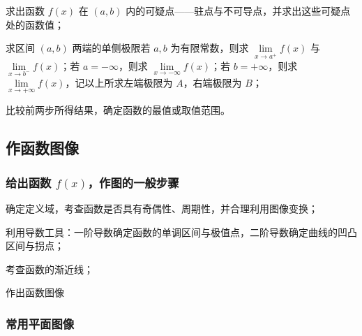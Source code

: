 \documentclass[a4paper,12pt]{article}
\begin{document}
    \begin{circlenum}
        \item 求出函数 $f(x)$ 在 $(a,b)$ 内的可疑点——驻点与不可导点，并求出这些可疑点处的函数值；
        \item 求区间 $(a,b)$ 两端的单侧极限若 $a,b$ 为有限常数，则求 $\lim\limits_{x\to a^+} f(x)$ 与 $\lim\limits_{x\to b^-} f(x)$；若 $a=-\infty$，则求 $\lim\limits_{x\to -\infty} f(x)$；若 $b=+\infty$，则求 $\lim\limits_{x\to +\infty} f(x)$，记以上所求左端极限为 $A$，右端极限为 $B$；
        \item 比较前两步所得结果，确定函数的最值或取值范围。
    \end{circlenum}

    \subsection{作函数图像}

    \subsubsection{给出函数 $f(x)$，作图的一般步骤}

    \begin{circlenum}
        \item 确定定义域，考查函数是否具有奇偶性、周期性，并合理利用图像变换；
        \item 利用导数工具：一阶导数确定函数的单调区间与极值点，二阶导数确定曲线的凹凸区间与拐点；
        \item 考查函数的渐近线；
        \item 作出函数图像
    \end{circlenum}

    \subsubsection{常用平面图像}
\end{document}

